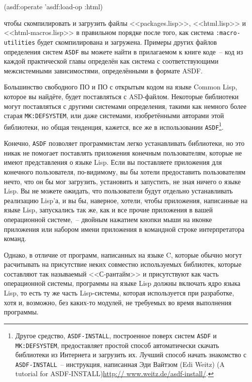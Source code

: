 \begin{myverb}
(asdf:operate 'asdf:load-op :html)
\end{myverb}

\noindent{}чтобы скомпилировать и загрузить файлы <<packages.lisp>>, <<html.lisp>> и
<<html-macros.lisp>> в правильном порядке после того, как система \lstinline{:macro-utilities}
будет скомпилирована и загружена. Примеры других файлов определения систем \lstinline{ASDF} вы
можете найти в прилагаемом к книге коде~-- код из каждой практической главы определён как
система с соответствующими межсистемными зависимостями, определёнными в формате ASDF.

Большинство свободного ПО и ПО с открытым кодом на языке Common Lisp, которое вы найдёте,
будет поставляться с ASD-файлом. Некоторые библиотеки могут поставляться с другими
системами определения, такими как немного более старая \lstinline{MK:DEFSYSTEM}, или даже
системами, изобретёнными авторами этой библиотеки, но общая тенденция, кажется, все же в
использовании \lstinline{ASDF}\footnote{Другое средство, \lstinline{ASDF-INSTALL},
  построенное поверх систем \lstinline{ASDF} и \lstinline{MK:DEFSYSTEM}, предоставляет
  простой способ автоматически скачать библиотеки из Интернета и загрузить их. Лучший
  способ начать знакомство с \lstinline{ASDF-INSTALL}~-- инструкция, написанная Эди
  Вайтзом (Edi Weitz) (A tutorial for ASDF-INSTALL)\url{http://
    www.weitz.de/asdf-install/}.}.

Конечно, \lstinline{ASDF} позволяет программистам легко устанавливать библиотеки, но это никак
не помогает поставлять приложения конечным пользователям, которые не имеют представления о
языке Lisp. Если вы поставляете приложения для конечного пользователя, по-видимому, вы бы
хотели предоставить пользователям нечто, что он бы мог загрузить, установить и запустить,
не зная ничего о языке Lisp. Вы не можете ожидать, что пользователи будут отдельно
устанавливать реализацию Lisp'а, и вы бы, наверное, хотели, чтобы приложения, написанные на
языке Lisp, запускались так же, как и все прочие приложения в вашей операционной
системе,~-- двойным нажатием кнопки мыши на иконке приложения или набором имени приложения
в командной строке интерпретатора команд.

Однако, в отличие от программ, написанных на языке C, которые обычно могут расчитывать на
присутствие неких совместно используемых библиотек, которые составляют так называемый
<<С-рантайм>> и присутствуют как часть операционной системы, программы на языке Lisp
должны включать ядро языка Lisp, то есть ту же часть Lisp-системы, которая используется
при разработке, хотя и, возможно, без каких-то модулей, не требуемых во время выполнения
программы.

